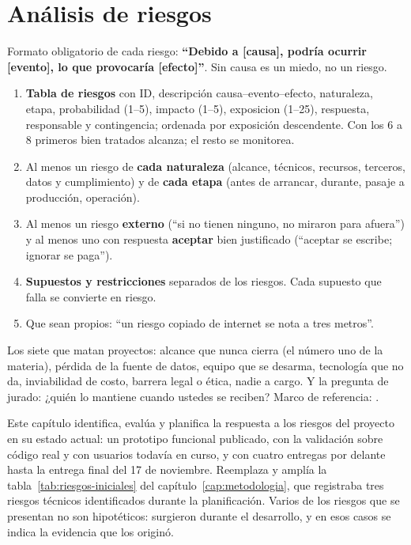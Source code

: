 
\chapter{Análisis de riesgos}\label{cap:riesgos}

\begin{guia}
Formato obligatorio de cada riesgo: \textbf{``Debido a [causa], podría
ocurrir [evento], lo que provocaría [efecto]''}. Sin causa es un miedo,
no un riesgo.
\begin{enumerate}
    \item \textbf{Tabla de riesgos} con ID, descripción causa--evento--efecto,
          naturaleza, etapa, probabilidad (1--5), impacto (1--5),
          \gls{exposicion} (1--25), respuesta, responsable y contingencia;
          ordenada por exposición descendente. Con los 6 a 8 primeros bien
          tratados alcanza; el resto se monitorea.
    \item Al menos un riesgo de \textbf{cada naturaleza} (alcance, técnicos,
          recursos, terceros, datos y cumplimiento) y de \textbf{cada etapa}
          (antes de arrancar, durante, pasaje a producción, operación).
    \item Al menos un riesgo \textbf{externo} (``si no tienen ninguno, no
          miraron para afuera'') y al menos uno con respuesta
          \textbf{aceptar} bien justificado (``aceptar se escribe; ignorar
          se paga'').
    \item \textbf{Supuestos y restricciones} separados de los riesgos. Cada
          supuesto que falla se convierte en riesgo.
    \item Que sean propios: ``un riesgo copiado de internet se nota a tres
          metros''.
\end{enumerate}
Los siete que matan proyectos: alcance que nunca cierra (el número uno
de la materia), pérdida de la fuente de datos, equipo que se desarma,
tecnología que no da, inviabilidad de costo, barrera legal o ética,
nadie a cargo. Y la pregunta de jurado: ¿quién lo mantiene cuando
ustedes se reciben? Marco de referencia: \citet{pmi2021}.
\end{guia}

Este capítulo identifica, evalúa y planifica la respuesta a los riesgos del proyecto en su estado actual: un prototipo funcional publicado, con la validación sobre código real y con usuarios todavía en curso, y con cuatro entregas por delante hasta la entrega final del 17 de noviembre. Reemplaza y amplía la tabla~\ref{tab:riesgos-iniciales} del capítulo~\ref{cap:metodologia}, que registraba tres riesgos técnicos identificados durante la planificación. Varios de los riesgos que se presentan no son hipotéticos: surgieron durante el desarrollo, y en esos casos se indica la evidencia que los originó.


